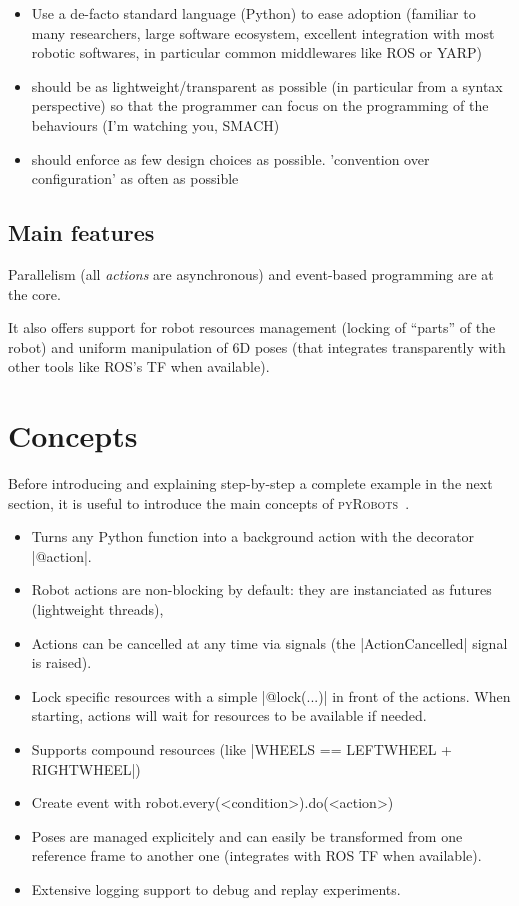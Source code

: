 \documentclass[a4paper, 10pt, conference]{ieeeconf}      %
\newcommand{\pyRobots}{\textsc{pyRobots}\ }
\begin{document}
\begin{itemize}
    \item Use a de-facto standard language (Python) to ease adoption (familiar to
        many researchers, large software ecosystem, excellent integration with
        most robotic softwares, in particular common middlewares like ROS or
        YARP)
    \item should be as lightweight/transparent as possible (in particular from a
        syntax perspective) so that the
        programmer can focus on the programming of the behaviours (I'm
        watching you, SMACH)
    \item should enforce as few design choices as possible. 'convention over
        configuration' as often as possible
\end{itemize}

\subsection{Main features}

Parallelism (all \emph{actions} are asynchronous) and event-based programming
are at the core.

It also offers support for robot resources management (locking of ``parts'' of
the robot) and uniform manipulation of 6D poses (that integrates transparently
with other tools like ROS's TF when available).

\section{Concepts}

Before introducing and explaining step-by-step a complete example in the next
section, it is useful to introduce the main concepts of \pyRobots.


\begin{itemize}
    \item Turns any Python function into a background action with the decorator
        \python|@action|.
    \item Robot actions are non-blocking by default: they are instanciated as
        futures (lightweight threads),
    \item Actions can be cancelled at any time via signals (the
        \python|ActionCancelled| signal is raised).
    \item Lock specific resources with a simple \python|@lock(...)| in front of the
        actions. When starting, actions will wait for resources to be
        available if needed.
    \item Supports compound resources (like \python|WHEELS == LEFTWHEEL + RIGHTWHEEL|)
    \item Create event with robot.every(<condition>).do(<action>)
    \item Poses are managed explicitely and can easily be
        transformed from one reference frame to another one
        (integrates with ROS TF when available).
    \item Extensive logging support to debug and replay
        experiments.
\end{itemize}
\end{document}
